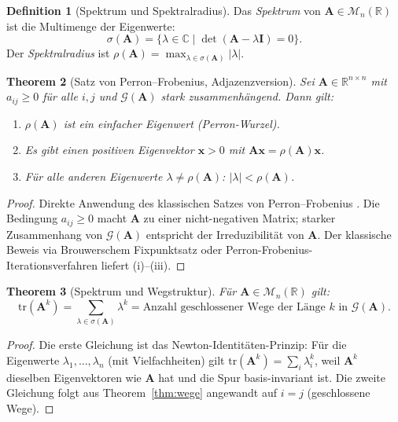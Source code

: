 ﻿\documentclass[12pt, a4paper]{article}
\newtheorem{theorem}{Theorem}[section]
\theoremstyle{definition}
\newtheorem{definition}[theorem]{Definition}
\theoremstyle{remark}
\newcommand{\R}{\mathbb{R}}
\newcommand{\C}{\mathbb{C}}
\newcommand{\vA}{\bm{A}}
\newcommand{\vI}{\bm{I}}
\newcommand{\tr}{\mathrm{tr}}
\newcommand{\spec}{\sigma}
\begin{document}
\begin{definition}[Spektrum und Spektralradius]
Das \emph{Spektrum} von $\vA \in \mathcal{M}_n(\R)$ ist die Multimenge
der Eigenwerte:
\[
  \spec(\vA) = \{\lambda \in \C \mid \det(\vA - \lambda \vI) = 0\}.
\]
Der \emph{Spektralradius} ist $\rho(\vA) = \max_{\lambda \in \spec(\vA)}|\lambda|$.
\end{definition}

\begin{theorem}[Satz von Perron--Frobenius, Adjazenzversion]
\label{thm:pf}
Sei $\vA \in \R^{n \times n}$ mit $a_{ij} \geq 0$ für alle $i,j$
und $\mathcal{G}(\vA)$ stark zusammenhängend. Dann gilt:
\begin{enumerate}[label=(\roman*)]
  \item $\rho(\vA)$ ist ein einfacher Eigenwert (Perron-Wurzel).
  \item Es gibt einen positiven Eigenvektor $\bm{x} > 0$ mit
    $\vA \bm{x} = \rho(\vA) \bm{x}$.
  \item Für alle anderen Eigenwerte $\lambda \neq \rho(\vA)$:
    $|\lambda| < \rho(\vA)$.
\end{enumerate}
\end{theorem}

\begin{proof}
Direkte Anwendung des klassischen Satzes von Perron--Frobenius
\citep{horn2013}. Die Bedingung $a_{ij} \geq 0$ macht $\vA$ zu einer
nicht-negativen Matrix; starker Zusammenhang von $\mathcal{G}(\vA)$
entspricht der Irreduzibilität von $\vA$. Der klassische Beweis via
Brouwerschem Fixpunktsatz oder Perron-Frobenius-Iterationsverfahren liefert
(i)--(iii).
\end{proof}

\begin{theorem}[Spektrum und Wegstruktur]
\label{thm:spur}
Für $\vA \in \mathcal{M}_n(\R)$ gilt:
\[
  \tr(\vA^k) = \sum_{\lambda \in \spec(\vA)} \lambda^k
  = \text{Anzahl geschlossener Wege der Länge } k \text{ in } \mathcal{G}(\vA).
\]
\end{theorem}

\begin{proof}
Die erste Gleichung ist das Newton-Identitäten-Prinzip: Für die
Eigenwerte $\lambda_1,\ldots,\lambda_n$ (mit Vielfachheiten) gilt
$\tr(\vA^k) = \sum_i \lambda_i^k$, weil $\vA^k$ dieselben Eigenvektoren
wie $\vA$ hat und die Spur basis-invariant ist. Die zweite Gleichung
folgt aus Theorem~\ref{thm:wege} angewandt auf $i = j$ (geschlossene Wege).
\end{proof}
\end{document}
